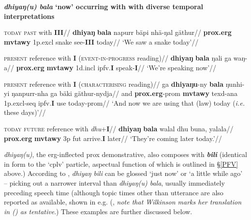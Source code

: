 \pex{} \textbf{\textit{dhiyaŋ(u) bala} `now' occurring with with diverse temporal interpretations}

\a{}\begingl\glpreamble \textsc{today past} with \textbf{III}//
\gla \textbf{dhiyaŋ} \textbf{bala} napurr bäpi nhä-ŋal gäthur//
\glb \textbf{\gls{prox}.\gls{erg}} \textbf{\gls{mvtawy}} 1p.\gls{excl} snake see-\textbf{III} today//
\glft`We saw a snake today'//\endgl



\a\begingl\glpreamble \textsc{present} reference with \textbf{I} (\textsc{event-in-progress} reading)//
\gla \textbf{dhiyaŋ} \textbf{bala} ŋali ga waŋ-a//
\glb \textbf{\gls{prox}.\gls{erg}} \textbf{\gls{mvtawy}} 1d.\gls{incl} \gls{ipfv}.\textbf{I} speak-\textbf{I}//
\glft`We're speaking now'\trailingcitation{[AW~20180730]}//\endgl


\a\begingl\glpreamble \textsc{present} reference with \textbf{I} (\textsc{characterising} reading)//
\gla ga \textbf{dhiyaŋu}-ny \textbf{bala} ŋunhi-yi ŋanpurr-nha ga bäki gäthur-nydja//
\glb and \textbf{\gls{prox}.\gls{erg}}-\gls{prom} \textbf{\gls{mvtawy}} \gls{texd}-\gls{ana} 1p.\gls{excl}-\gls{seq} \gls{ipfv}.\textbf{I} use today-\gls{prom}//
\glft`And now we are using that (law) today (\textit{i.e.} these days)'//\endgl

\a\begingl\glpreamble \textsc{today future} reference with \textit{dhu}+\textbf{I}//
\gla \textbf{dhiyaŋ} \textbf{bala} walal dhu buna, yalala//
\glb \textbf{\gls{prox}.\gls{erg}} \textbf{\gls{mvtawy}} 3p \gls{fut} arrive.\textbf{I} later//
\glft`They're coming later today.'//\endgl

\xe



\textit{dhiyaŋ(u)}, the \gls{erg}-inflected \gls{prox} demonstrative, also composes with \textbf{\textit{bili}} (identical in form to the `\gls{cplv}' particle, aspectual function of which is outlined in §\ref{PFV} above.) According to \citet[295]{Wilkinson1991}, \textit{dhiyaŋ bili} can be glossed `just now' or `a little while ago' -- picking out a narrower interval than \textit{dhiyaŋ(u) bala}, usually immediately preceding speech time (although topic times other than utterance are also reported as available, shown in e.g. (, \textsl{note that Wilkinson marks her translation in () as tentative}.) These examples are further discussed below.

